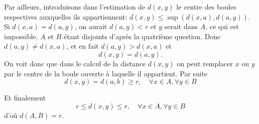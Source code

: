 {\begin{enumerate}
{Par ailleurs, introduisons dans l'estimation de $d(x,y)$ le centre des boules
respectives auxquelles ils appartiennent:
$d(x,y)\le \sup(d(x,a),d(a,y))$.  Si $d(x,a) = d(a,y)$, on aurait
$d(a,y)<r$ et
$y$ serait dans $A$, ce qui est impossible, $A$ et $B$ \'etant disjoints
d'apr\`es la quatrième question. Donc $d(a,y)\neq d(x,a)$, et en fait $d(a,y)> d(x,a)$ et 
$$d(x,y) = d(a,y).$$
On voit donc que dans le calcul de la distance $d(x,y)$ on peut remplacer
$x$ ou $y$ par le centre de la boule ouverte \`a laquelle il appartient.
Par suite 
$$d(x,y) = d(a,b)\ge r,\quad \forall x\in A,\forall y\in B$$

Et finalement
$$r\le d(x,y)\le r, \quad \forall x\in A,\forall y\in B$$ 
d'o\`u $d(A,B)= r$.}
\end{enumerate}
}